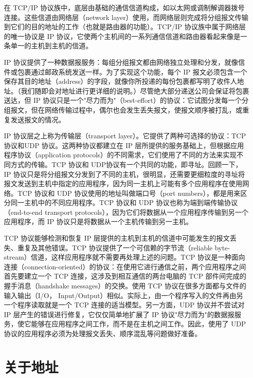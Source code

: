		在 TCP/IP 协议族中，底层由基础的通信信道构成，如以太网或调制解调器拨号连接。这些信道由网络层（network layer）使用，而网络层则完成将分组报文传输到它们的目的地址的工作（也就是路由器的功能）。TCP/IP 协议族中属于网络层的唯一协议是 IP 协议，它使两个主机间的一系列通信信道和路由器看起来像是一条单一的主机到主机的信道。

		IP 协议提供了一种数据报服务：每组分组报文都由网络独立处理和分发，就像信件或包裹通过邮政系统发送一样。为了实现这个功能，每个 IP 报文必须包含一个保存其目的地址（address）的字段，就像你所投递的每份包裹都写明了收件人地址。（我们随即会对地址进行更详细的说明。）尽管绝大部分递送公司会保证将包裹送达，但 IP 协议只是一个"尽力而为"（best-effort）的协议：它试图分发每一个分组报文，但在网络传输过程中，偶尔也会发生丢失报文，使报文顺序被打乱，或重复发送报文的情况。

		IP 协议层之上称为传输层（transport layer）。它提供了两种可选择的协议：TCP 协议和UDP 协议。这两种协议都建立在 IP 层所提供的服务基础上，但根据应用程序协议（application protocols）的不同需求，它们使用了不同的方法来实现不同方式的传输。TCP 协议和 UDP协议有一个共同的功能，即寻址。回顾一下，IP 协议只是将分组报文分发到了不同的主机，很明显，还需要更细粒度的寻址将报文发送到主机中指定的应用程序，因为同一主机上可能有多个应用程序在使用网络。TCP 协议和 UDP 协议使用的地址叫做端口号（port numbers），都是用来区分同一主机中的不同应用程序。TCP 协议和 UDP 协议也称为端到端传输协议 （end-to-end transport protocols），因为它们将数据从一个应用程序传输到另一个应用程序，而 IP 协议只是将数据从一个主机传输到另一主机。

		TCP 协议能够检测和恢复 IP 层提供的主机到主机的信道中可能发生的报文丢失、重复及其他错误。TCP 协议提供了一个可信赖的字节流（reliable byte-stream）信道，这样应用程序就不需要再处理上述的问题。TCP 协议是一种面向连接（connection-oriented）的协议：在使用它进行通信之前，两个应用程序之间首先要建立一个 TCP 连接，这涉及到相互通信的两台电脑的 TCP 部件间完成的握手消息（handshake messages）的交换。使用 TCP 协议在很多方面都与文件的输入输出（I/O， Input/Output）相似。实际上，由一个程序写入的文件再由另一个程序读取就是一个 TCP 连接的适当模型。另一方面，UDP 协议并不尝试对 IP 层产生的错误进行修复，它仅仅简单地扩展了 IP 协议"尽力而为"的数据报服务，使它能够在应用程序之间工作，而不是在主机之间工作。因此，使用了 UDP 协议的应用程序必须为处理报文丢失、顺序混乱等问题做好准备。


	\section{关于地址}

